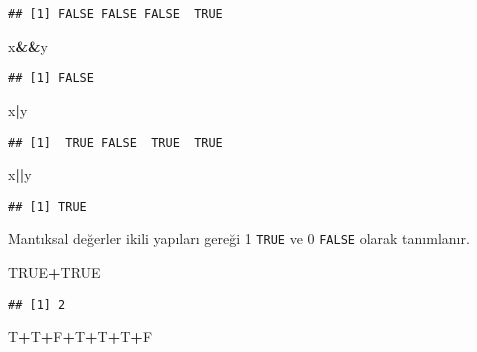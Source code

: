 \documentclass[
]{book}
\newenvironment{Shaded}{\begin{snugshade}}{\end{snugshade}}
\newcommand{\NormalTok}[1]{#1}
\newcommand{\OperatorTok}[1]{\textcolor[rgb]{0.81,0.36,0.00}{\textbf{#1}}}
\newcommand{\OtherTok}[1]{\textcolor[rgb]{0.56,0.35,0.01}{#1}}
\begin{document}
\begin{verbatim}
## [1] FALSE FALSE FALSE  TRUE
\end{verbatim}

\begin{Shaded}
\begin{Highlighting}[]
\NormalTok{x}\OperatorTok{&&}\NormalTok{y}
\end{Highlighting}
\end{Shaded}

\begin{verbatim}
## [1] FALSE
\end{verbatim}

\begin{Shaded}
\begin{Highlighting}[]
\NormalTok{x}\OperatorTok{|}\NormalTok{y}
\end{Highlighting}
\end{Shaded}

\begin{verbatim}
## [1]  TRUE FALSE  TRUE  TRUE
\end{verbatim}

\begin{Shaded}
\begin{Highlighting}[]
\NormalTok{x}\OperatorTok{||}\NormalTok{y}
\end{Highlighting}
\end{Shaded}

\begin{verbatim}
## [1] TRUE
\end{verbatim}

Mantıksal değerler ikili yapıları gereği 1 \texttt{TRUE} ve 0 \texttt{FALSE} olarak tanımlanır.

\begin{Shaded}
\begin{Highlighting}[]
\OtherTok{TRUE}\OperatorTok{+}\OtherTok{TRUE}
\end{Highlighting}
\end{Shaded}

\begin{verbatim}
## [1] 2
\end{verbatim}

\begin{Shaded}
\begin{Highlighting}[]
\NormalTok{T}\OperatorTok{+}\NormalTok{T}\OperatorTok{+}\NormalTok{F}\OperatorTok{+}\NormalTok{T}\OperatorTok{+}\NormalTok{T}\OperatorTok{+}\NormalTok{T}\OperatorTok{+}\NormalTok{F}
\end{Highlighting}
\end{Shaded}
\end{document}
